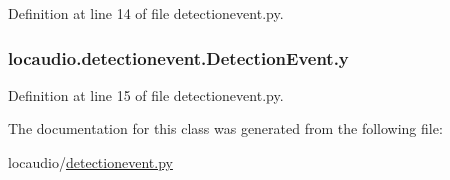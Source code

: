 Definition at line 14 of file detectionevent.\-py.

\hypertarget{classlocaudio_1_1detectionevent_1_1DetectionEvent_aab867d871d3ab2bc608936ab64051b56}{
\subsubsection[{y}]{\setlength{\rightskip}{0pt plus 5cm}locaudio.\-detectionevent.\-Detection\-Event.\-y}}\label{classlocaudio_1_1detectionevent_1_1DetectionEvent_aab867d871d3ab2bc608936ab64051b56}


Definition at line 15 of file detectionevent.\-py.



The documentation for this class was generated from the following file\-:\begin{DoxyCompactItemize}
\item 
locaudio/\hyperlink{detectionevent_8py}{detectionevent.\-py}\end{DoxyCompactItemize}
